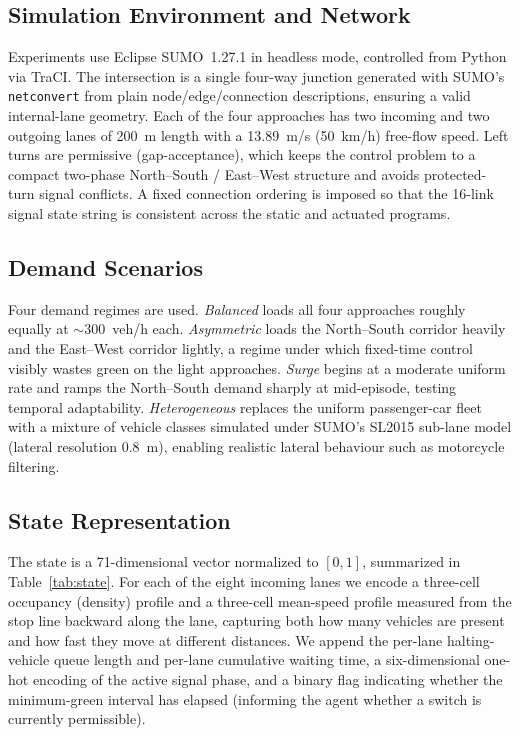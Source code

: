 \documentclass[conference]{IEEEtran}
\begin{document}
\subsection{Simulation Environment and Network}
Experiments use Eclipse SUMO~1.27.1 in headless mode, controlled from Python via
TraCI. The intersection is a single four-way junction generated with SUMO's
\texttt{netconvert} from plain node/edge/connection descriptions, ensuring a
valid internal-lane geometry. Each of the four approaches has two incoming and
two outgoing lanes of 200~m length with a 13.89~m/s (50~km/h) free-flow speed.
Left turns are permissive (gap-acceptance), which keeps the control problem to a
compact two-phase North--South / East--West structure and avoids protected-turn
signal conflicts. A fixed connection ordering is imposed so that the 16-link
signal state string is consistent across the static and actuated programs.

\subsection{Demand Scenarios}
Four demand regimes are used. \emph{Balanced} loads all four approaches roughly
equally at $\sim$300~veh/h each. \emph{Asymmetric} loads the North--South
corridor heavily and the East--West corridor lightly, a regime under which
fixed-time control visibly wastes green on the light approaches. \emph{Surge}
begins at a moderate uniform rate and ramps the North--South demand sharply at
mid-episode, testing temporal adaptability. \emph{Heterogeneous} replaces the
uniform passenger-car fleet with a mixture of vehicle classes simulated under
SUMO's SL2015 sub-lane model (lateral resolution 0.8~m), enabling realistic
lateral behaviour such as motorcycle filtering.

\subsection{State Representation}
The state is a 71-dimensional vector normalized to $[0,1]$, summarized in
Table~\ref{tab:state}. For each of the eight incoming lanes we encode a
three-cell occupancy (density) profile and a three-cell mean-speed profile
measured from the stop line backward along the lane, capturing both how many
vehicles are present and how fast they move at different distances. We append the
per-lane halting-vehicle queue length and per-lane cumulative waiting time, a
six-dimensional one-hot encoding of the active signal phase, and a binary flag
indicating whether the minimum-green interval has elapsed (informing the agent
whether a switch is currently permissible).
\end{document}
